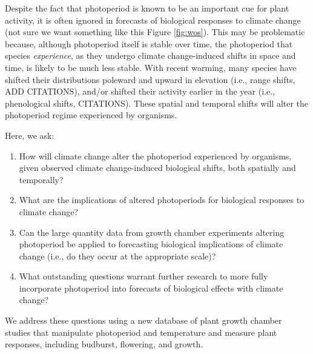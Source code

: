 \documentclass{article}
\begin{document}
\par Despite the fact that photoperiod is known to be an important cue for plant activity, it is often ignored in forecasts of biological responses to climate change (not sure we want something like this Figure \ref{fig:wos}). This may be problematic because, although photoperiod itself is stable over time, the photoperiod that species \emph{experience}, as they undergo climate change-induced shifts in space and time, is likely to be much less stable. With recent warming, many species have shifted their distributions poleward and upward in elevation (i.e., range shifts, ADD CITATIONS), and/or shifted their activity earlier in the year (i.e., phenological shifts, CITATIONS). These spatial and temporal shifts will alter the photoperiod regime experienced by organisms. 


\par Here, we ask: 
\begin{enumerate}
\item How will climate change alter the photoperiod experienced by organisms, given observed climate change-induced biological shifts, both spatially and temporally?
\item What are the implications of altered photoperiods for biological responses to climate change?
\item Can the large quantity data from growth chamber experiments altering photoperiod be applied to forecasting biological implications of climate change (i.e., do they occur at the appropriate scale)?
\item What outstanding questions warrant further research to more fully incorporate photoperiod into forecasts of biological effects with climate change?
\end{enumerate}
\par We address these questions using a new database of plant growth chamber studies that manipulate photoperiod and temperature and measure plant responses, including budburst, flowering, and growth. 
\end{document}
